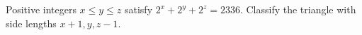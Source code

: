 Positive integers $x\le y\le z$ satisfy $2^x+2^y+2^z=2336$. Classify the triangle with side lengths $x+1,y,z-1$.
